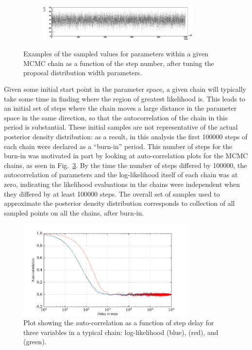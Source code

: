 \begin{figure}
    \begin{subfigure}{0.98\textwidth}
        \centering
        \includegraphics[width=0.9\textwidth]{6_SolarAnalysis/images/theta_12_vs_step_MCMC.png}
        \caption{\tonetwo{}}
        \label{fig:theta_12_vs_step}
    \end{subfigure}
    \caption{Examples of the sampled values for parameters within a given MCMC chain as a function of the step number, after tuning the proposal distribution width parameters.}
    \label{fig:params_vs_step_plots}
\end{figure}

Given some initial start point in the parameter space, a given chain will typically take some time in finding where the region of greatest likelihood is. This leads to an initial set of steps where the chain moves a large distance in the parameter space in the same direction, so that the autocorrelation of the chain in this period is substantial. These initial samples are not representative of the actual posterior density distribution: as a result, in this analysis the first \num{100000} steps of each chain were declared as a ``burn-in'' period. This number of steps for the burn-in was motivated in part by looking at auto-correlation plots for the MCMC chains, as seen in Fig.~\ref{fig:auto_corr}. By the time the number of steps differed by \num{100000}, the autocorrelation of parameters and the log-likelihood itself of each chain was at zero, indicating the likelihood evaluations in the chains were independent when they differed by at least \num{100000} steps. The overall set of samples used to approximate the posterior density distribution corresponds to collection of all sampled points on all the chains, after burn-in.

\begin{figure}
    \centering
    \includegraphics[width=0.8\textwidth]{6_SolarAnalysis/images/autocorr_plot_llh_dmsq_theta12.pdf}
    \caption[Plot showing the auto-correlation as a function of step delay for three variables in a typical chain]
    {Plot showing the auto-correlation as a function of step delay for three variables in a typical chain: log-likelihood (blue), \dmsq{} (red), and \tonetwo{} (green).}
    \label{fig:auto_corr}
\end{figure}


